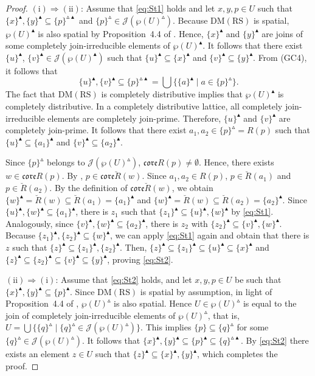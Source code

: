 \documentclass[11pt,a4paper]{amsart}
\newcommand{\UP}{\blacktriangle}
\newcommand{\Up}{\vartriangle}
\theoremstyle{plain}
\theoremstyle{definition}
\theoremstyle{remark}
\numberwithin{equation}{section}
\begin{document}
\begin{proof}
$\mathrm{(i)}\Rightarrow\mathrm{(ii)}$:  
Assume that \eqref{eq:St1} holds and let $x,y,p\in U$
such that $\{x\}^\UP,\{y\}^\UP \subseteq \{p\}^{\Up \UP}$ and 
$\{p\}^\Up \in\mathcal{J}(\wp(U)^\Up)$. 
Because $\mathrm{DM(RS)}$ is spatial, $\wp(U)^\UP$ is also spatial by Proposition~{4.4} of \cite{JarRad25}.
Hence, $\{x\}^\UP$ and $\{y\}^\UP$ are joins of some completely 
join-irreducible elements of $\wp(U)^\UP$. It follows that
there exist $\{u\}^\UP$, $\{v\}^\UP \in\mathcal{J}(\wp(U)^\UP)$ 
such that  $\{u\}^\UP \subseteq \{x\}^\UP$ and
$\{v\}^\UP \subseteq \{y\}^\UP$. From  (GC4), it follows that
\[  \{u\}^\UP,  \{v\}^\UP \subseteq \{p\}^{\Up \UP} =  \bigcup \{ \{a\}^\UP \mid a \in \{p\}^\Up \} . \]
The fact that $\mathrm{DM(RS)}$ is completely distributive implies that
$\wp(U)^\UP$ is completely distributive. In a completely distributive 
lattice, all completely join-irreducible elements are completely
join-prime. Therefore, $\{u\}^\UP$ and  $\{v\}^\UP$ are completely
join-prime. It follows that there exist $a_1, a_2 \in \{p\}^\Up = R(p)$
such that $\{u\}^\UP \subseteq \{a_1\}^\UP$
and  $\{v\}^\UP \subseteq \{a_2\}^\UP$.

Since $\{p\}^\Up$ belongs to $\mathcal{J}(\wp(U)^\Up)$, 
$\mathfrak{core}R(p) \neq \emptyset$. Hence, there exists 
$w\in\mathfrak{core}R(p)$. By \cite[Lemma~{4.13}]{JarRad25}, 
$p \in \mathfrak{core} \breve{R}(w)$. 
Since $a_1,a_2 \in R(p)$, $p \in \breve{R}(a_1)$ and 
$p \in \breve{R}(a_2)$. By the definition of 
$\mathfrak{core}\breve{R}(w)$, we obtain 
$\{w\}^\UP = \breve{R}(w) \subseteq \breve{R}(a_1) = \{a_1\}^\UP$ 
and $\{w\}^\UP = \breve{R}(w) \subseteq \breve{R}(a_2) = \{a_2\}^\UP$. 
Since $\{u\}^\UP, \{w\}^\UP \subseteq\{a_1\}^\UP$,  there is $z_1$ 
such that $\{z_1\}^\UP \subseteq \{u\}^\UP, \{w\}^\UP$
by \eqref{eq:St1}. Analogously, since $\{v\}^\UP,\{w\}^\UP \subseteq \{a_2\}^\UP$, 
there is $z_2$ with  $\{z_2\}^\UP \subseteq \{v\}^\UP, \{w\}^\UP$.
Because $\{z_{1}\}^\UP,\{z_{2}\}^\UP\subseteq \{w\}^\UP$, 
we can apply \eqref{eq:St1} again and obtain that
there is $z$ such that $\{z\}^\UP \subseteq
\{z_1\}^\UP,\{z_2\}^\UP$. Then, 
$\{z\}^\UP \subseteq\{z_1\}^\UP \subseteq \{u\}^\UP \subseteq\{x\}^\UP$ and 
$\{z\}^\UP \subseteq \{z_2\}^\UP \subseteq \{v\}^\UP \subseteq\{y\}^\UP$, 
proving \eqref{eq:St2}. 

\smallskip\noindent%
$\mathrm{(ii)}\Rightarrow\mathrm{(i)}$:  
Assume that \eqref{eq:St2} holds, and let $x,y,p\in U$ be such that
$\{x\}^\UP, \{y\}^\UP \subseteq \{p\}^\UP$. 
Since $\mathrm{DM(RS)}$ is spatial by assumption, 
in light of Proposition~{4.4} of \cite{JarRad25}, $\wp(U)^\Up$ is also spatial. 
Hence $U\in\wp(U)^\Up$ is equal to the join of completely 
join-irreducible elements of $\wp(U)^\Up$, that is, 
$U= \bigcup \{\{q\}^\Up \mid \{q\}^\Up \in\mathcal{J}(\wp(U)^\Up)\}$. 
This implies $\{p\}\subseteq \{q\}^\Up$ for some
$\{q\}^\Up \in \mathcal{J}(\wp(U)^\Up)$. It follows that
$\{x\}^\UP, \{y\}^\UP \subseteq \{p\}^\UP \subseteq
\{q\}^{\Up \UP}$. By \eqref{eq:St2} there exists
an element $z\in U$ such that $\{z\}^\UP \subseteq
\{x\}^\UP, \{y\}^\UP$, which completes the proof. 


\end{proof}
\end{document}

